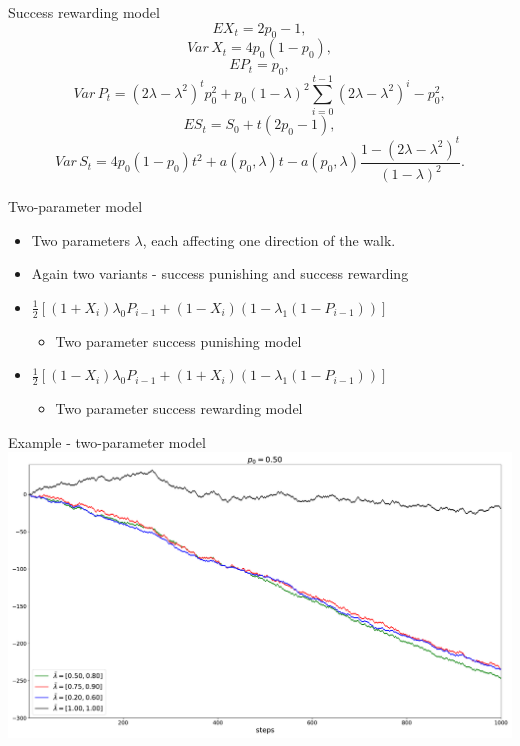 \documentclass[american]{beamer}
\begin{document}
    \begin{frame}{Success rewarding model}
        \[
            EX_{t}=2p_{0}-1,
        \]
        \[
            Var\,X_{t}=4p_{0}(1-p_{0}),
        \]
        \[
            EP_{t}=p_{0},
        \]
        \[
            Var\,P_{t}=(2\lambda-\lambda^{2})^{t}p_{0}^{2}+p_{0}(1-\lambda)^{2}\sum_{i=0}^{t-1}(2\lambda-\lambda^{2})^{i}-p_{0}^{2},
        \]
        \[
            ES_{t}=S_{0}+t(2p_{0}-1),
        \]
        \[
            Var\,S_{t}=4p_{0}(1-p_{0})t^{2}+a(p_{0},\lambda)t-a(p_{0},\lambda)\frac{1-(2\lambda-\lambda^{2})^{t}}{(1-\lambda)^{2}}.
        \]
    \end{frame}

    \begin{frame}{Two-parameter model}
        \begin{itemize}
            \item Two parameters $\lambda$, each affecting one direction of the walk.
            \item Again two variants - success punishing and success rewarding
            \item<1-> $\frac{1}{2}[(1+X_{i})\lambda_{0}P_{i-1}+(1-X_{i})(1-\lambda_{1}(1-P_{i-1}))]$
            \begin{itemize}
                \item<1-> Two parameter success punishing model \medskip{}
            \end{itemize}
            \item<1-> $\frac{1}{2}[(1-X_{i})\lambda_{0}P_{i-1}+(1+X_{i})(1-\lambda_{1}(1-P_{i-1}))]$
            \begin{itemize}
                \item<1-> Two parameter success rewarding model
            \end{itemize}
        \end{itemize}
    \end{frame}

    \begin{frame}{Example - two-parameter model}
        \includegraphics[width=1\textwidth]{../../simulations/single_walk_1000_steps_type_success_punished_two_lambdas}
    \end{frame}
\end{document}
